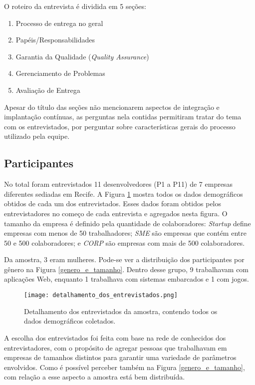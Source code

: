 O roteiro da entrevista é dividida em 5 seções: 

\begin{enumerate}
\item Processo de entrega no geral
\item Papéis/Responsabilidades
\item Garantia da Qualidade (\emph{Quality Assurance})
\item Gerenciamento de Problemas
\item Avaliação de Entrega
\end{enumerate}

Apesar do título das seções não mencionarem aspectos de integração e implantação contínuas, as perguntas nela contidas permitiram tratar do tema com os entrevistados, por perguntar sobre características gerais do processo utilizado pela equipe.

\subsection{Participantes}

No total foram entrevistados 11 desenvolvedores (P1 a P11) de 7 empresas diferentes sediadas em Recife. A Figura \ref{detalhamento_dos_entrevistados} mostra todos os dados demográficos obtidos de cada um dos entrevistados. Esses dados foram obtidos pelos entrevistadores no começo de cada entrevista e agregados nesta figura. O tamanho da empresa é definido pela quantidade de colaboradores: \emph{Startup} define empresas com menos de 50 trabalhadores; \emph{SME} são empresas que contém entre 50 e 500 colaboradores; e \emph{CORP} são empresas com mais de 500 colaboradores.


Da amostra, 3 eram mulheres. Pode-se ver a distribuição dos participantes por gênero na Figura \ref{genero_e_tamanho}. Dentro desse grupo, 9 trabalhavam com aplicações Web, enquanto 1 trabalhava com sistemas embarcados e 1 com jogos.

\begin{figure}[h]
\centering
\texttt{[image: detalhamento\_dos\_entrevistados.png]}
\caption{Detalhamento dos entrevistados da amostra, contendo todos os dados demográficos coletados.}
\label{detalhamento_dos_entrevistados}
\end{figure}


A escolha dos entrevistados foi feita com base na rede de conhecidos dos entrevistadores, com o propósito de agregar pessoas que trabalhavam em empresas de tamanhos distintos para garantir uma variedade de parâmetros envolvidos. Como é possível perceber também na Figura \ref{genero_e_tamanho}, com relação a esse aspecto a amostra está bem distribuída. 


